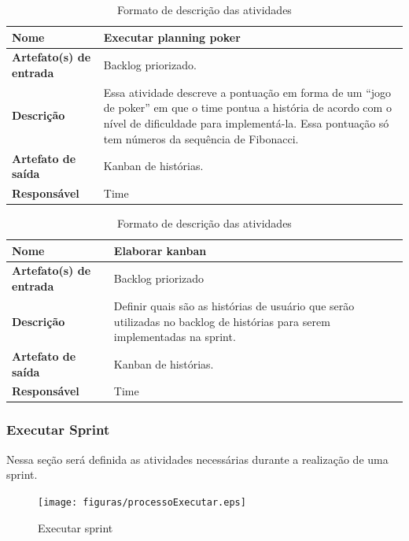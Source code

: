 \begin{table}[h]
    \centering
    \label{descricaoAtividades}
    \caption{Formato de descrição das atividades}
        \begin{tabular}{|l|p{10cm}|}
        \hline
        \textbf{Nome} & Executar planning poker \\
        \hline
        \textbf{Artefato(s) de entrada} & Backlog priorizado. \\
        \hline
        \textbf{Descrição} & Essa atividade descreve a pontuação em forma de um “jogo de poker” em que o time pontua a história de acordo com o nível de dificuldade para implementá-la. Essa pontuação só tem números da sequência de Fibonacci. \\
        \hline
        \textbf{Artefato de saída} & Kanban de histórias. \\
        \hline
        \textbf{Responsável} & Time \\
        \hline
    \end{tabular}
\end{table}

\begin{table}[h]
    \centering
    \label{descricaoAtividades}
    \caption{Formato de descrição das atividades}
        \begin{tabular}{|l|p{10cm}|}
        \hline
        \textbf{Nome} & Elaborar kanban \\
        \hline
        \textbf{Artefato(s) de entrada} & Backlog priorizado \\
        \hline
        \textbf{Descrição} & Definir quais são as histórias de usuário que serão utilizadas no backlog de histórias para serem implementadas na sprint. \\
        \hline
        \textbf{Artefato de saída} & Kanban de histórias. \\
        \hline
        \textbf{Responsável} & Time \\
        \hline
    \end{tabular}
\end{table}

\subsubsection{Executar Sprint}

Nessa seção será definida as atividades necessárias durante a realização de uma sprint.

\begin{figure}[H]
    \centering
    \caption{Executar sprint}
    \label{processoExecutar}
    \texttt{[image: figuras/processoExecutar.eps]}
\end{figure}

